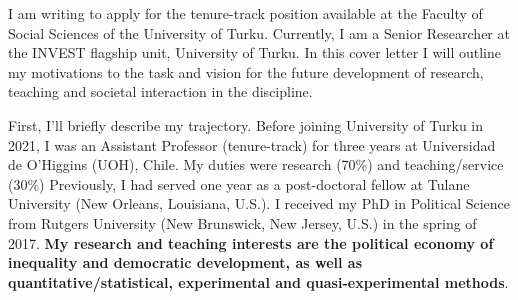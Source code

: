 \documentclass[10pt,stdletter,dateno,sigleft]{newlfm} %
\begin{document}
\begin{newlfm}


\vspace{-2cm}I am writing to apply for the tenure-track position available at the Faculty of Social Sciences of the University of Turku. Currently, I am a Senior Researcher at the INVEST flagship unit, University of Turku. In this cover letter I will outline my motivations to the task and vision for the future development of research, teaching and societal interaction in the discipline.

First, I'll briefly describe my trajectory. Before joining University of Turku in 2021, I was an Assistant Professor (tenure-track) for three years at Universidad de O'Higgins (UOH), Chile. My duties were research (70\%) and teaching/service (30\%) Previously, I had served one year as a post-doctoral fellow at Tulane University (New Orleans, Louisiana, U.S.). I received my PhD in Political Science from Rutgers University (New Brunswick, New Jersey, U.S.) in the spring of 2017. {\bf My research and teaching interests are the political economy of inequality and democratic development, as well as quantitative/statistical, experimental and quasi-experimental methods}. 






\end{newlfm}
\end{document}
